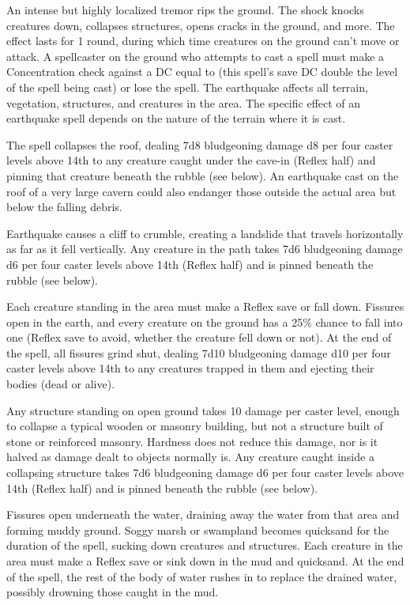 \spellrng{\rngfar}
\begin{spelleffect}
  An intense but highly localized tremor rips the ground. The shock knocks creatures down, collapses structures, opens cracks in the ground, and more. The effect lasts for 1 round, during which time creatures on the ground can't move or attack. A spellcaster on the ground who attempts to cast a spell must make a Concentration check against a DC equal to (this spell's save DC \add double the level of the spell being cast) or lose the spell. The earthquake affects all terrain, vegetation, structures, and creatures in the area. The specific effect of an earthquake spell depends on the nature of the terrain where it is cast.
  \par {} The spell collapses the roof, dealing 7d8 bludgeoning damage \add d8 per four caster levels above 14th to any creature caught under the cave-in (Reflex half) and pinning that creature beneath the rubble (see below). An earthquake cast on the roof of a very large cavern could also endanger those outside the actual area but below the falling debris.
  \par {} Earthquake causes a cliff to crumble, creating a landslide that travels horizontally as far as it fell vertically. Any creature in the path takes 7d6 bludgeoning damage \add d6 per four caster levels above 14th (Reflex half) and is pinned beneath the rubble (see below).
  \par {} Each creature standing in the area must make a Reflex save or fall down. Fissures open in the earth, and every creature on the ground has a 25\% chance to fall into one (Reflex save to avoid, whether the creature fell down or not). At the end of the spell, all fissures grind shut, dealing 7d10 bludgeoning damage \add d10 per four caster levels above 14th to any creatures trapped in them and ejecting their bodies (dead or alive).
  \par {} Any structure standing on open ground takes 10 damage per caster level, enough to collapse a typical wooden or masonry building, but not a structure built of stone or reinforced masonry. Hardness does not reduce this damage, nor is it halved as damage dealt to objects normally is. Any creature caught inside a collapsing structure takes 7d6 bludgeoning damage \add d6 per four caster levels above 14th (Reflex half) and is pinned beneath the rubble (see below).
  \par {} Fissures open underneath the water, draining away the water from that area and forming muddy ground. Soggy marsh or swampland becomes quicksand for the duration of the spell, sucking down creatures and structures. Each creature in the area must make a Reflex save or sink down in the mud and quicksand. At the end of the spell, the rest of the body of water rushes in to replace the drained water, possibly drowning those caught in the mud.
\end{spelleffect}
